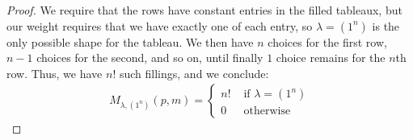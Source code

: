 \documentclass[12pt]{extarticle}
\newcommand{\<}{\langle}
\renewcommand{\>}{\rangle}
\theoremstyle{definition}
\begin{document}
\begin{proof}
  We require that the rows have constant entries in the filled tableaux, but our weight requires that we have exactly one of each entry, so $\lambda = (1^n)$ is the only possible shape for the tableau. We then have $n$ choices for the first row, $n-1$ choices for the second, and so on, until finally $1$ choice remains for the $n$th row. Thus, we have $n!$ such fillings, and we conclude:
  \begin{align*}
    M_{\lambda, (1^n)}(p,m) =
    \begin{cases}
      n! & \text{ if } \lambda = (1^n) \\
      0 & \text{ otherwise}
    \end{cases}
  \end{align*}
\end{proof}
\end{document}
